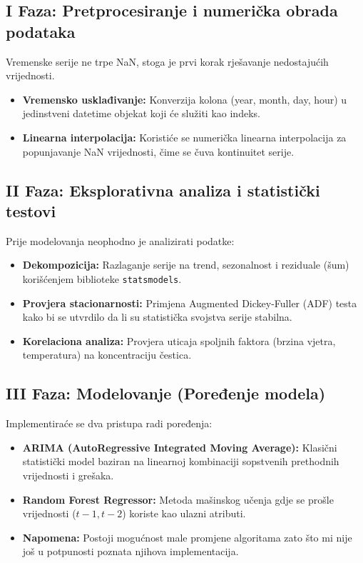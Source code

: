 \documentclass[12pt]{article}
\begin{document}
	\subsection*{I Faza: Pretprocesiranje i numerička obrada podataka}
	Vremenske serije ne trpe NaN, stoga je prvi korak rješavanje nedostajućih vrijednosti.
	\begin{itemize}
		\item \textbf{Vremensko usklađivanje:} Konverzija kolona (year, month, day, hour) u jedinstveni datetime objekat koji će služiti kao indeks.
		\item \textbf{Linearna interpolacija:} Koristiće se numerička linearna interpolacija za popunjavanje NaN vrijednosti, čime se čuva kontinuitet serije.
	\end{itemize}
	
	\subsection*{II Faza: Eksplorativna analiza i statistički testovi}
	Prije modelovanja neophodno je analizirati podatke:
	\begin{itemize}
		\item \textbf{Dekompozicija:} Razlaganje serije na trend, sezonalnost i reziduale (šum) korišćenjem biblioteke \texttt{statsmodels}.
		\item \textbf{Provjera stacionarnosti:} Primjena Augmented Dickey-Fuller (ADF) testa kako bi se utvrdilo da li su statistička svojstva serije stabilna.
		\item \textbf{Korelaciona analiza:} Provjera uticaja spoljnih faktora (brzina vjetra, temperatura) na koncentraciju čestica.
	\end{itemize}
	
	\subsection*{III Faza: Modelovanje (Poređenje modela)}
	Implementiraće se dva pristupa radi poređenja:
	\begin{itemize}
		\item \textbf{ARIMA (AutoRegressive Integrated Moving Average):} Klasični statistički model baziran na linearnoj kombinaciji sopstvenih prethodnih vrijednosti i grešaka.
		\item \textbf{Random Forest Regressor:} Metoda mašinskog učenja gdje se prošle vrijednosti ($t-1, t-2$) koriste kao ulazni atributi.
		\item \textbf{Napomena:} Postoji mogućnost male promjene algoritama zato što mi nije još u potpunosti poznata njihova implementacija.
		
	\end{itemize}
	
\end{document}
